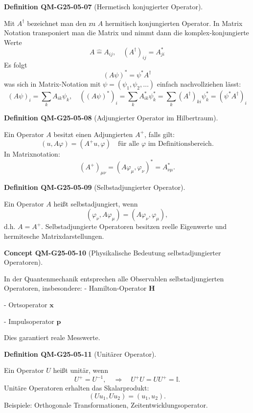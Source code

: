 \documentclass[10pt, letterpaper]{article}
\newcommand{\CustomHeading}[3]{%
  \par\medskip\noindent%
  \textbf{#1 #2} \textnormal{(#3)}.\enskip%
}
\newenvironment{DEF}[2]{\CustomHeading{Definition}{#1}{#2}}{}
\newenvironment{CONC}[2]{\CustomHeading{Concept}{#1}{#2}}{}
\begin{document}
\begin{DEF}{QM-G25-05-07}{Hermetisch konjugierter Operator}
Mit $A^{\dagger}$ bezeichnet man den zu $A$ hermitisch konjungierten Operator. In Matrix Notation transponiert man die Matrix und nimmt dann die komplex-konjungierte Werte
$$
A \hat{=} A_{i j}, \quad\left(A^{\dagger}\right)_{i j}=A_{j i}^{*}
$$
Es folgt
$$
(A \psi)^{*}=\psi^{*} A^{\dagger}
$$
was sich in Matrix-Notation mit $\psi=\left(\psi_{1}, \psi_{2}, \ldots\right)$ einfach nachvollziehen lässt:
$$
(A \psi)_{i}=\sum_{k} A_{i k} \psi_{k}, \quad\left((A \psi)^{*}\right)_{i}=\sum_{k} A_{i k}^{*} \psi_{k}^{*}=\sum_{k}\left(A^{\dagger}\right)_{k i} \psi_{k}^{*}=\left(\psi^{*} A^{\dagger}\right)_{i}
$$
\end{DEF}

\begin{DEF}{QM-G25-05-08}{Adjungierter Operator im Hilbertraum}
Ein Operator $A$ besitzt einen Adjungierten $A^+$, falls gilt:
\[
(u, A \varphi) = (A^+ u, \varphi) \quad \text{für alle } \varphi \text{ im Definitionsbereich}.
\]
In Matrixnotation:
\[
(A^+)_{\mu\nu} = (A \varphi_\mu, \varphi_\nu)^* = A^*_{\nu\mu}.
\]
\end{DEF}

\begin{DEF}{QM-G25-05-09}{Selbstadjungierter Operator}
Ein Operator $A$ heißt selbstadjungiert, wenn
\[
(\varphi_\nu, A \varphi_\mu) = (A \varphi_\nu, \varphi_\mu),
\]
d.h. $A = A^+$. Selbstadjungierte Operatoren besitzen reelle Eigenwerte und hermitesche Matrixdarstellungen.
\end{DEF}

\begin{CONC}{QM-G25-05-10}{Physikalische Bedeutung selbstadjungierter Operatoren}
In der Quantenmechanik entsprechen alle Observablen selbstadjungierten Operatoren, insbesondere:
- Hamilton-Operator $\mathbf{H}$

- Ortsoperator $\mathbf{x}$

- Impulsoperator $\mathbf{p}$

Dies garantiert reale Messwerte.
\end{CONC}

\begin{DEF}{QM-G25-05-11}{Unitärer Operator}
Ein Operator $U$ heißt unitär, wenn
\[
U^+ = U^{-1}, \quad \Rightarrow \quad U^+ U = UU^+ = \mathbb{I}.
\]
Unitäre Operatoren erhalten das Skalarprodukt:
\[
(U u_1, U u_2) = (u_1, u_2).
\]
Beispiele: Orthogonale Transformationen, Zeitentwicklungsoperator.
\end{DEF}
\end{document}
